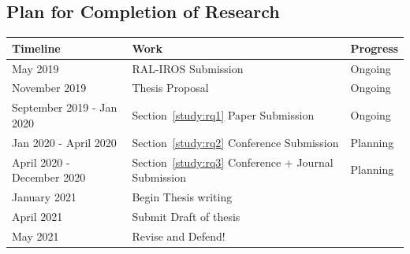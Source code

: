 \documentclass[12pt]{article}
\begin{document}
\subsection{Plan for Completion of Research}
\begin{center}
	\begin{tabular}{ m{5cm}  m{8cm} m{3cm} } 
		Timeline & Work & Progress \\
		\hline
		
		May 2019 & RAL-IROS Submission & Ongoing \\
		
		November 2019 & Thesis Proposal & Ongoing \\ 
		September 2019 - Jan 2020 & Section~\ref{study:rq1} Paper Submission & Ongoing \\ 
		
		 Jan 2020 - April 2020 & Section~\ref{study:rq2} Conference Submission  & Planning \\
		 
		 April 2020 - December 2020 & Section~\ref{study:rq3} Conference + Journal Submission  & Planning \\
		 
		 January 2021 & Begin Thesis writing & \\
		 April 2021 & Submit Draft of thesis & \\
		 May 2021 & Revise and Defend! & \\
		  
		\hline
	\end{tabular}
\end{center}
\begin{footnotesize}


\end{footnotesize}
\end{document}
